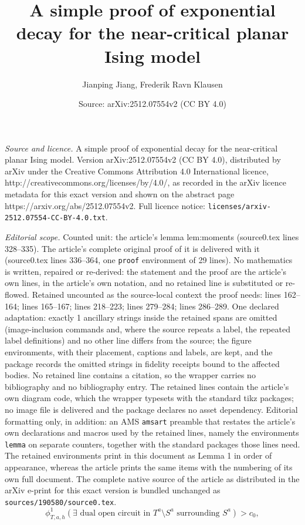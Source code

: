 \documentclass[10pt,a4paper]{amsart}
\title{A simple proof of exponential decay for the near-critical planar Ising model}
\author{Jianping Jiang, Frederik Ravn Klausen}
\date{Source: arXiv:2512.07554v2 (CC BY 4.0)}
\begin{document}
\maketitle

\noindent\emph{Source and licence.} A simple proof of exponential decay for the near-critical planar Ising model. Version arXiv:2512.07554v2 (CC BY 4.0), distributed by arXiv under the Creative Commons Attribution 4.0 International licence, http://creativecommons.org/licenses/by/4.0/, as recorded in the arXiv licence metadata for this exact version and shown on the abstract page https://arxiv.org/abs/2512.07554v2. Full licence notice: \texttt{licenses/arxiv-2512.07554-CC-BY-4.0.txt}.\par\smallskip

\noindent\textit{Editorial scope.} Counted unit: the article's lemma lem:moments (source0.tex lines 328--335). The article's complete original proof of it is delivered with it (source0.tex lines 336--364, one \texttt{proof} environment of 29 lines). No mathematics is written, repaired or re-derived: the statement and the proof are the article's own lines, in the article's own notation, and no retained line is substituted or re-flowed.  Retained uncounted as the source-local context the proof needs: lines 162--164; lines 165--167; lines 218--223; lines 279--284; lines 286--289.  One declared adaptation: exactly 1 ancillary strings inside the retained spans are omitted (image-inclusion commands and, where the source repeats a label, the repeated label definitions) and no other line differs from the source; the figure environments, with their placement, captions and labels, are kept, and the package records the omitted strings in fidelity receipts bound to the affected bodies.  No retained line contains a citation, so the wrapper carries no bibliography and no bibliography entry.  The retained lines contain the article's own diagram code, which the wrapper typesets with the standard tikz packages; no image file is delivered and the package declares no asset dependency.  Editorial formatting only, in addition: an AMS \texttt{amsart} preamble that restates the article's own declarations and macros used by the retained lines, namely the environments \texttt{lemma} on separate counters, together with the standard packages those lines need.  The retained environments print in this document as Lemma 1 in order of appearance, whereas the article prints the same items with the numbering of its own full document.  The complete native source of the article as distributed in the arXiv e-print for this exact version is bundled unchanged as \texttt{sources/190580/source0.tex}.
\begin{equation}\label{eq:nearcriticalRSW}
	\phi^1_{T,a,h}(\exists \text{ dual open circuit in }T^a\setminus S^a \text{ surrounding }S^a)>c_0,
\end{equation}
\end{document}
